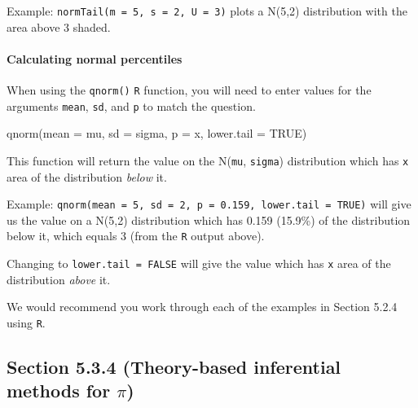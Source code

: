 \documentclass[
]{report}
\newenvironment{Shaded}{\begin{snugshade}}{\end{snugshade}}
\newcommand{\AttributeTok}[1]{\textcolor[rgb]{0.77,0.63,0.00}{#1}}
\newcommand{\ConstantTok}[1]{\textcolor[rgb]{0.00,0.00,0.00}{#1}}
\newcommand{\FunctionTok}[1]{\textcolor[rgb]{0.00,0.00,0.00}{#1}}
\newcommand{\NormalTok}[1]{#1}
\begin{document}
Example: \texttt{normTail(m\ =\ 5,\ s\ =\ 2,\ U\ =\ 3)} plots a N(5,2) distribution with the area above 3 shaded.

\hypertarget{calculating-normal-percentiles}{%
\paragraph*{Calculating normal percentiles}\label{calculating-normal-percentiles}}

When using the \texttt{qnorm()} \texttt{R} function, you will need to enter values for the arguments \texttt{mean}, \texttt{sd}, and \texttt{p} to match the question.

\begin{Shaded}
\begin{Highlighting}[]
\FunctionTok{qnorm}\NormalTok{(}\AttributeTok{mean =}\NormalTok{ mu, }\AttributeTok{sd =}\NormalTok{ sigma, }\AttributeTok{p =}\NormalTok{ x, }\AttributeTok{lower.tail =} \ConstantTok{TRUE}\NormalTok{)}
\end{Highlighting}
\end{Shaded}

This function will return the value on the N(\texttt{mu}, \texttt{sigma}) distribution which has \texttt{x} area of the distribution \emph{below} it.

Example: \texttt{qnorm(mean\ =\ 5,\ sd\ =\ 2,\ p\ =\ 0.159,\ lower.tail\ =\ TRUE)} will give us the value on a N(5,2) distribution which has 0.159 (15.9\%) of the distribution below it, which equals 3 (from the \texttt{R} output above).

Changing to \texttt{lower.tail\ =\ FALSE} will give the value which has \texttt{x} area of the distribution \emph{above} it.

We would recommend you work through each of the examples in Section 5.2.4 using \texttt{R}.

\hypertarget{section-5.3.4-theory-based-inferential-methods-for-pi}{%
\subsection*{\texorpdfstring{Section 5.3.4 (Theory-based inferential methods for \(\pi\))}{Section 5.3.4 (Theory-based inferential methods for \textbackslash pi)}}\label{section-5.3.4-theory-based-inferential-methods-for-pi}}

\end{document}
